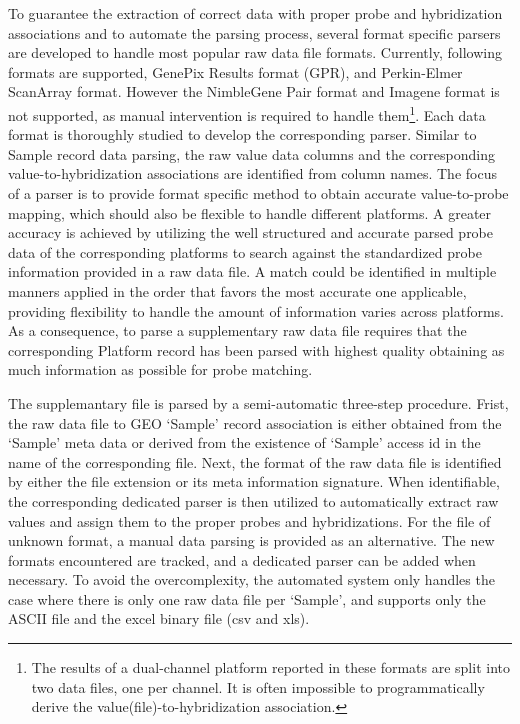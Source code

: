 To guarantee the extraction of correct data with proper probe and
hybridization associations and to automate the parsing process, several
format specific parsers are developed to handle most popular raw data file
formats.
%
Currently, following formats are supported, GenePix Results format (GPR),
and Perkin-Elmer ScanArray format.  
However the NimbleGene Pair format and Imagene format is not supported, as
manual intervention is required to handle them\footnote{The results of a
  dual-channel platform reported in these formats are split into two data
  files, one per channel.  It is often impossible to programmatically derive
  the value(file)-to-hybridization association.}.
%
Each data format is thoroughly studied to develop the corresponding parser.
Similar to Sample record data parsing, the raw value data columns and the
corresponding value-to-hybridization associations are identified from column
names.
%
The focus of a parser is to provide format specific method to obtain accurate
value-to-probe mapping, which should also be flexible to handle different
platforms.
%
A greater accuracy is achieved by utilizing the well structured and accurate
parsed probe data of the corresponding platforms to search against the
standardized probe information provided in a raw data file.
%
A match could be identified in multiple manners applied in the order that
favors the most accurate one applicable, providing flexibility to handle the
amount of information varies across platforms.
%
As a consequence, to parse a supplementary raw data file requires that the
corresponding Platform record has been parsed with highest quality obtaining
as much information as possible for probe matching.


The supplemantary file is parsed by a semi-automatic three-step procedure.
%
Frist, the raw data file to GEO `Sample' record association is either
obtained from the `Sample' meta data or derived from the existence of
`Sample' access id in the name of the corresponding file.
%
Next, the format of the raw data file is identified by either the file
extension or its meta information signature.
%
When identifiable, the corresponding dedicated parser is then utilized to
automatically extract raw values and assign them to the proper probes and
hybridizations.
%
For the file of unknown format, a manual data parsing is provided as an
alternative.
%
The new formats encountered are tracked, and a dedicated parser can be added
when necessary.
%
%
To avoid the overcomplexity, the automated system only handles the case
where there is only one raw data file per `Sample', and supports only the
ASCII file and the excel binary file (csv and xls).

